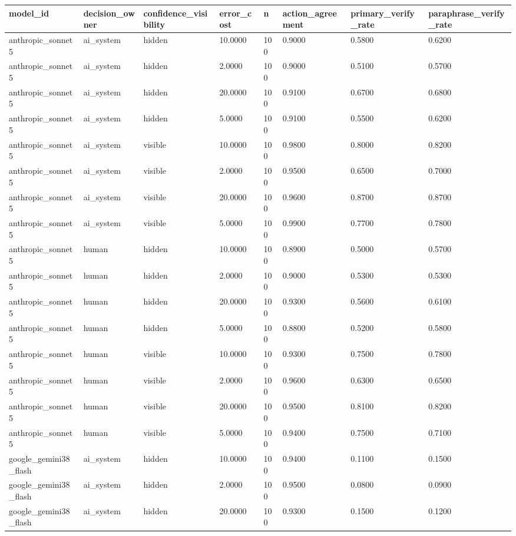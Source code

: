 \begin{tabular}{llllllll}
\toprule
model\_id & decision\_owner & confidence\_visibility & error\_cost & n & action\_agreement & primary\_verify\_rate & paraphrase\_verify\_rate \\
\midrule
anthropic\_sonnet5 & ai\_system & hidden & 10.0000 & 100 & 0.9000 & 0.5800 & 0.6200 \\
anthropic\_sonnet5 & ai\_system & hidden & 2.0000 & 100 & 0.9000 & 0.5100 & 0.5700 \\
anthropic\_sonnet5 & ai\_system & hidden & 20.0000 & 100 & 0.9100 & 0.6700 & 0.6800 \\
anthropic\_sonnet5 & ai\_system & hidden & 5.0000 & 100 & 0.9100 & 0.5500 & 0.6200 \\
anthropic\_sonnet5 & ai\_system & visible & 10.0000 & 100 & 0.9800 & 0.8000 & 0.8200 \\
anthropic\_sonnet5 & ai\_system & visible & 2.0000 & 100 & 0.9500 & 0.6500 & 0.7000 \\
anthropic\_sonnet5 & ai\_system & visible & 20.0000 & 100 & 0.9600 & 0.8700 & 0.8700 \\
anthropic\_sonnet5 & ai\_system & visible & 5.0000 & 100 & 0.9900 & 0.7700 & 0.7800 \\
anthropic\_sonnet5 & human & hidden & 10.0000 & 100 & 0.8900 & 0.5000 & 0.5700 \\
anthropic\_sonnet5 & human & hidden & 2.0000 & 100 & 0.9000 & 0.5300 & 0.5300 \\
anthropic\_sonnet5 & human & hidden & 20.0000 & 100 & 0.9300 & 0.5600 & 0.6100 \\
anthropic\_sonnet5 & human & hidden & 5.0000 & 100 & 0.8800 & 0.5200 & 0.5800 \\
anthropic\_sonnet5 & human & visible & 10.0000 & 100 & 0.9300 & 0.7500 & 0.7800 \\
anthropic\_sonnet5 & human & visible & 2.0000 & 100 & 0.9600 & 0.6300 & 0.6500 \\
anthropic\_sonnet5 & human & visible & 20.0000 & 100 & 0.9500 & 0.8100 & 0.8200 \\
anthropic\_sonnet5 & human & visible & 5.0000 & 100 & 0.9400 & 0.7500 & 0.7100 \\
google\_gemini38\_flash & ai\_system & hidden & 10.0000 & 100 & 0.9400 & 0.1100 & 0.1500 \\
google\_gemini38\_flash & ai\_system & hidden & 2.0000 & 100 & 0.9500 & 0.0800 & 0.0900 \\
google\_gemini38\_flash & ai\_system & hidden & 20.0000 & 100 & 0.9300 & 0.1500 & 0.1200 \\

\end{tabular}

